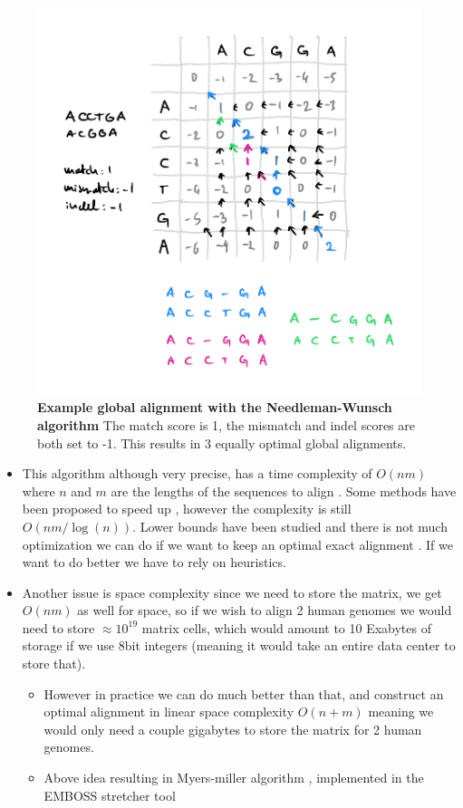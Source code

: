\documentclass[
  11pt,
  twoside]{scrbook}
\providecommand{\tightlist}{%
  \setlength{\itemsep}{0pt}\setlength{\parskip}{0pt}}
\newcommand{\extcaption}[2]{
    \caption[#1]{
        \textbf{#1}\newline
        #2
    }
}
\begin{document}
\begin{figure}[h]
\centering
\includegraphics[width=0.6\linewidth]{./figures/Align-Intro/Nw-dp.pdf}
\extcaption{Example global alignment with the Needleman-Wunsch algorithm}{The match score is 1, the mismatch and indel scores are both set to -1. This results in 3 equally optimal global alignments.}
\label{fig:nwAlign}
\end{figure}

\begin{itemize}
\tightlist
\item
  This algorithm although very precise, has a time complexity of \(O(nm)\) where \(n\) and \(m\) are the lengths of the sequences to align \autocite{sungAlgorithmsBioinformaticsPractical2011}. Some methods have been proposed to speed up \autocite{masekFasterAlgorithmComputing1980}, however the complexity is still \(O(nm/\log(n))\). Lower bounds have been studied and there is not much optimization we can do if we want to keep an optimal exact alignment \autocite{vinhInformationTheoreticMeasures2010,ullmanBoundsComplexityLongest1976}. If we want to do better we have to rely on heuristics.
\item
  Another issue is space complexity since we need to store the matrix, we get \(O(nm)\) as well for space, so if we wish to align 2 human genomes we would need to store \(\approx 10^{19}\) matrix cells, which would amount to 10 Exabytes of storage if we use 8bit integers (meaning it would take an entire data center to store that).

  \begin{itemize}
  \item
    However in practice we can do much better than that, and construct an optimal alignment in linear space complexity \(O(n+m)\) \autocite{hirschbergLinearSpaceAlgorithm1975} meaning we would only need a couple gigabytes to store the matrix for 2 human genomes.
  \item
    Above idea resulting in Myers-miller algorithm \autocite{myersOptimalAlignmentsLinear1988}, implemented in the EMBOSS stretcher tool \autocite{riceEMBOSSEuropeanMolecular2000}
  \end{itemize}
\end{itemize}
\end{document}
